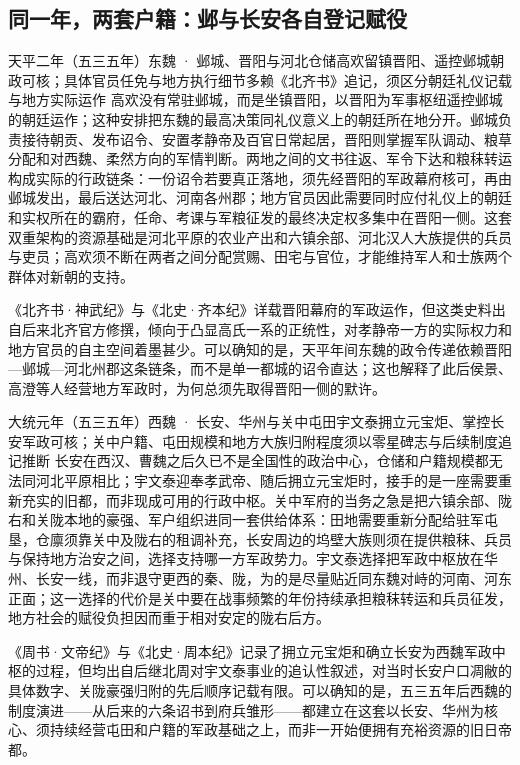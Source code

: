 \subsection{同一年，两套户籍：邺与长安各自登记赋役}

\begin{event}{}{天平二年（五三五年）}{东魏 · 邺城、晋阳与河北仓储}{高欢留镇晋阳、遥控邺城朝政可核；具体官员任免与地方执行细节多赖《北齐书》追记，须区分朝廷礼仪记载与地方实际运作}
高欢没有常驻邺城，而是坐镇晋阳，以晋阳为军事枢纽遥控邺城的朝廷运作；这种安排把东魏的最高决策同礼仪意义上的朝廷所在地分开。邺城负责接待朝贡、发布诏令、安置孝静帝及百官日常起居，晋阳则掌握军队调动、粮草分配和对西魏、柔然方向的军情判断。两地之间的文书往返、军令下达和粮秣转运构成实际的行政链条：一份诏令若要真正落地，须先经晋阳的军政幕府核可，再由邺城发出，最后送达河北、河南各州郡；地方官员因此需要同时应付礼仪上的朝廷和实权所在的霸府，任命、考课与军粮征发的最终决定权多集中在晋阳一侧。这套双重架构的资源基础是河北平原的农业产出和六镇余部、河北汉人大族提供的兵员与吏员；高欢须不断在两者之间分配赏赐、田宅与官位，才能维持军人和士族两个群体对新朝的支持。

《北齐书·神武纪》与《北史·齐本纪》详载晋阳幕府的军政运作，但这类史料出自后来北齐官方修撰，倾向于凸显高氏一系的正统性，对孝静帝一方的实际权力和地方官员的自主空间着墨甚少。可以确知的是，天平年间东魏的政令传递依赖晋阳—邺城—河北州郡这条链条，而不是单一都城的诏令直达；这也解释了此后侯景、高澄等人经营地方军政时，为何总须先取得晋阳一侧的默许。
\end{event}

\begin{event}{}{大统元年（五三五年）}{西魏 · 长安、华州与关中屯田}{宇文泰拥立元宝炬、掌控长安军政可核；关中户籍、屯田规模和地方大族归附程度须以零星碑志与后续制度追记推断}
长安在西汉、曹魏之后久已不是全国性的政治中心，仓储和户籍规模都无法同河北平原相比；宇文泰迎奉孝武帝、随后拥立元宝炬时，接手的是一座需要重新充实的旧都，而非现成可用的行政中枢。关中军府的当务之急是把六镇余部、陇右和关陇本地的豪强、军户组织进同一套供给体系：田地需要重新分配给驻军屯垦，仓廪须靠关中及陇右的租调补充，长安周边的坞壁大族则须在提供粮秣、兵员与保持地方治安之间，选择支持哪一方军政势力。宇文泰选择把军政中枢放在华州、长安一线，而非退守更西的秦、陇，为的是尽量贴近同东魏对峙的河南、河东正面；这一选择的代价是关中要在战事频繁的年份持续承担粮秣转运和兵员征发，地方社会的赋役负担因而重于相对安定的陇右后方。

《周书·文帝纪》与《北史·周本纪》记录了拥立元宝炬和确立长安为西魏军政中枢的过程，但均出自后继北周对宇文泰事业的追认性叙述，对当时长安户口凋敝的具体数字、关陇豪强归附的先后顺序记载有限。可以确知的是，五三五年后西魏的制度演进——从后来的六条诏书到府兵雏形——都建立在这套以长安、华州为核心、须持续经营屯田和户籍的军政基础之上，而非一开始便拥有充裕资源的旧日帝都。
\end{event}


